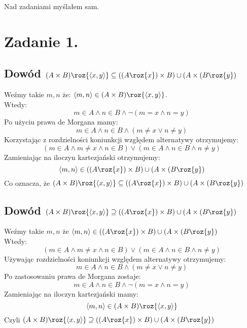 \documentclass{article}
\begin{document}
 
 
 
 
 
 
 
 
 
 
\maketitle
Nad zadaniami myślałem sam.
\section*{Zadanie 1.}
\subsection*{Dowód $(A \times B) \roz \{\langle x,y\rangle\} \subseteq (( A\roz  \{x\}) \times B) \cup (A\times (B\roz\{y\})$}
Weźmy takie $m,n$ że: $\langle m,n \rangle \in (A \times B) \roz \{\langle x,y\rangle\} $.\\ Wtedy: \[ m \in A \wedge n \in  B \wedge \lnot (m = x \wedge  n = y)\]
Po użyciu prawa de Morgana mamy: \[ m \in A \wedge n \in  B \wedge  (m \neq x \vee  n \neq y)\]
Korzystając z rozdzielności koniunkcji względem alternatywy otrzymujemy: 
\[ (m \in A \wedge m \neq x \wedge n \in  B  ) \vee ( m \in A \wedge n \in  B \wedge n \neq y)\]
Zamieniając na iloczyn kartezjański otrzymujemy:
\[\langle m,n \rangle \in (( A\roz  \{x\}) \times B) \cup (A\times (B\roz\{y\})\]
Co oznacza, że $(A \times B) \roz \{\langle x,y\rangle\} \subseteq (( A\roz  \{x\}) \times B) \cup (A\times (B\roz\{y\})$


\subsection*{Dowód $(A \times B) \roz \{\langle x,y\rangle\} \supseteq (( A\roz  \{x\}) \times B) \cup (A\times (B\roz\{y\})$}
Weźmy takie $m,n$ że $\langle m,n\rangle \in ((A\roz  \{x\}) \times B) \cup (A\times (B\roz\{y\})$\\
Wtedy:\[ (m \in A \wedge m \neq x \wedge n \in  B  ) \vee ( m \in A \wedge n \in  B \wedge n \neq y)\]
Używając rozdzielności koniunkcji względem alternatywy otrzymujemy:
\[ m \in A \wedge n \in  B \wedge  (m \neq x \vee  n \neq y)\]
Po zastosowaniu prawa de Morgana zostaje:
\[ m \in A \wedge n \in  B \wedge \lnot (m = x \wedge  n = y)\]
Zamieniając na iloczyn kartezjański mamy:\[\langle m,n \rangle \in (A \times B) \roz \{\langle x,y\rangle\}\]
Czyli $(A \times B) \roz \{\langle x,y\rangle\} \supseteq (( A\roz  \{x\}) \times B) \cup (A\times (B\roz\{y\})$
\end{document}
